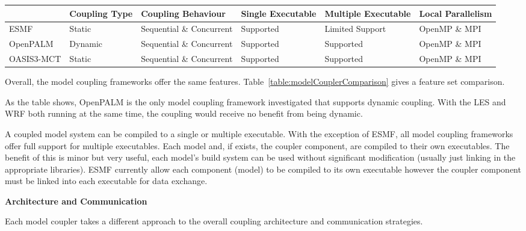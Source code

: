 \begin{figure*}
    \begin{tabular}{|l|l|l|l|l|l|}
        \hline
        & Coupling Type & Coupling Behaviour & Single Executable & Multiple
        Executable & Local Parallelism\\
        \hline
        ESMF & Static & Sequential \& Concurrent & Supported & Limited Support &
        OpenMP \& MPI\\
        \hline
        OpenPALM & Dynamic & Sequential \& Concurrent & Supported & Supported &
        OpenMP \& MPI\\
        \hline
        OASIS3-MCT & Static & Sequential \& Concurrent & Supported & Supported &
        OpenMP \& MPI\\
        \hline
    \end{tabular}
    \caption{Comparison of model coupling frameworks}
    \label{table:modelCouplerComparison}
\end{figure*}

Overall, the model coupling frameworks offer the same features.
Table~\ref{table:modelCouplerComparison} gives a feature set comparison.

As the table shows, OpenPALM is the only model coupling framework investigated
that supports dynamic coupling. With the LES and WRF both running at the same
time, the coupling would receive no benefit from being dynamic.

A coupled model system can be compiled to a single or multiple executable. With
the exception of ESMF, all model coupling frameworks offer full support for
multiple executables. Each model and, if exists, the coupler component, are
compiled to their own executables. The benefit of this is minor but very useful,
each model's build system can be used without significant modification (usually
just linking in the appropriate libraries). ESMF currently allow each component
(model) to be compiled to its own executable however the coupler component must
be linked into each executable for data exchange.

\textbf{Architecture and Communication}

Each model coupler takes a different approach to the overall coupling
architecture and communication strategies.

